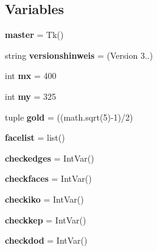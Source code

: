 \subsection*{Variables}
\begin{DoxyCompactItemize}
\item 
\mbox{\label{namespacelatest_a1dbb538a5d92d65f7608b93cdecf0fc6}} 
{\bfseries master} = Tk()
\item 
\mbox{\label{namespacelatest_a17dd50f4fc4979fbd3e4074c8fc52cf8}} 
string {\bfseries versionshinweis} = \textquotesingle{}(Version 3..)\textquotesingle{}
\item 
\mbox{\label{namespacelatest_a04b177ae0ab72ff901554d809a916d83}} 
int {\bfseries mx} = 400
\item 
\mbox{\label{namespacelatest_a996c51d3be7037cb817abf0cb6d830e6}} 
int {\bfseries my} = 325
\item 
\mbox{\label{namespacelatest_a4e13d7014c3873fa7692c1cea0a83b11}} 
tuple {\bfseries gold} = ((math.\+sqrt(5)-\/1)/2)
\item 
\mbox{\label{namespacelatest_acad5e09bfe541bab4735840596b06875}} 
{\bfseries facelist} = list()
\item 
\mbox{\label{namespacelatest_a8d300f816e6ca42bfc01686e2fd98935}} 
{\bfseries checkedges} = Int\+Var()
\item 
\mbox{\label{namespacelatest_ad95d9eeadd8b5e7f1f1d028bf4196ff7}} 
{\bfseries checkfaces} = Int\+Var()
\item 
\mbox{\label{namespacelatest_a1e429e013a1fef1115621ace693b41f0}} 
{\bfseries checkiko} = Int\+Var()
\item 
\mbox{\label{namespacelatest_a229c9afb31a35d11abae335aa04ca8b6}} 
{\bfseries checkkep} = Int\+Var()
\item 
\mbox{\label{namespacelatest_ab8dee4dedda34dc997bc4187f1e0c3a5}} 
{\bfseries checkdod} = Int\+Var()

\end{DoxyCompactItemize}
